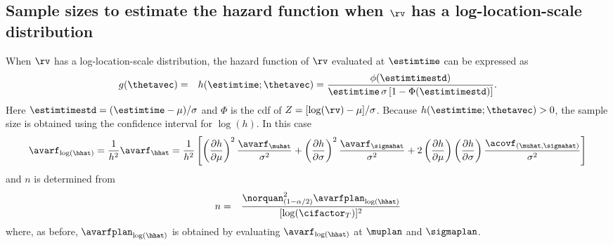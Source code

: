 \subsection{Sample sizes to estimate the hazard function
when $\rv$ has a log-location-scale distribution}

When $\rv$ has a log-location-scale distribution,
the hazard function of $\rv$ evaluated at  $\estimtime$
can be expressed as
\begin{eqnarray*}
 g(\thetavec)&=&h(\estimtime ; \thetavec)
  = \frac{\phi(\estimtimestd)}
        {\estimtime \, \sigma \left [1-\Phi(\estimtimestd) \right ]}.
\end{eqnarray*}
Here $\estimtimestd=(\estimtime-\mu)/\sigma$ and 
$\Phi$ is the cdf of $Z=[\log(\rv)-\mu]/\sigma$.
Because $h(\estimtime ; \thetavec) >0$, the sample size is
obtained using the confidence interval for $\log(h)$. In this case
\begin{equation}
\label{equation:log.hazard.avar}
\avarf_{\log(\hhat)} =
\frac{1}{h^{2}}
\avarf_{\hhat} = 
\frac{1}{h^{2}}
        \left [\left (\frac{\partial h}{\partial\mu} \right )^{2}  
        \frac{\avarf_{\muhat}}{\sigma^{2}} +
\left (\frac{\partial h}{\partial\sigma}\right)^2  
\frac{\avarf_{\sigmahat}}{\sigma^{2}}
+ 2 \left( \frac{\partial h}{\partial\mu} \right)
\left( \frac{\partial h}{\partial\sigma} \right) 
\frac{\acovf_{(\muhat, \sigmahat)}}{\sigma^{2}} \right ]
\end{equation}
and
$n$ is determined from
\begin{eqnarray*}
n&=&\frac{\norquan_{(1-\alpha/2)}^{2} 
\avarfplan_{\log(\hhat)}}{[\log(\cifactor_{T})]^2}
\end{eqnarray*}
where, as before, $\avarfplan_{\log(\hhat)}$ is obtained by
evaluating $\avarf_{\log(\hhat)}$ at $\muplan$ and $\sigmaplan$.


